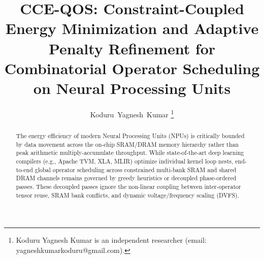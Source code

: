 \documentclass[journal]{IEEEtran}
\theoremstyle{definition}
\begin{document}
\title{CCE-QOS: Constraint-Coupled Energy Minimization and Adaptive Penalty Refinement for Combinatorial Operator Scheduling on Neural Processing Units}

\author{Koduru~Yagnesh~Kumar%
\thanks{Koduru Yagnesh Kumar is an independent researcher (email: yagneshkumarkoduru@gmail.com).}}

\maketitle

\begin{abstract}
The energy efficiency of modern Neural Processing Units (NPUs) is critically bounded by data movement across the on-chip SRAM/DRAM memory hierarchy rather than peak arithmetic multiply-accumulate throughput. While state-of-the-art deep learning compilers (e.g., Apache TVM, XLA, MLIR) optimize individual kernel loop nests, end-to-end global operator scheduling across constrained multi-bank SRAM and shared DRAM channels remains governed by greedy heuristics or decoupled phase-ordered passes. These decoupled passes ignore the non-linear coupling between inter-operator tensor reuse, SRAM bank conflicts, and dynamic voltage/frequency scaling (DVFS).


\end{abstract}
\end{document}
